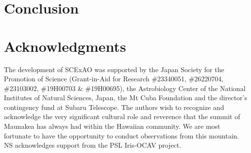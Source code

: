 \documentclass[twocolumn]{aastex62}
\begin{document}
\section{Conclusion}



\section{Acknowledgments}
The development of SCExAO was supported by the Japan Society for the Promotion of Science (Grant-in-Aid for Research \#23340051, \#26220704, \#23103002, \#19H00703 \& \#19H00695), the Astrobiology Center of the National Institutes of Natural Sciences, Japan, the Mt Cuba Foundation and the director's contingency fund at Subaru Telescope. The authors wish to recognize and acknowledge the very significant cultural role and reverence that the summit of Maunakea has always had within the Hawaiian community. We are most fortunate to have the opportunity to conduct observations from this mountain. NS acknowledges support from the PSL Iris-OCAV project. 


\newpage


\end{document}
